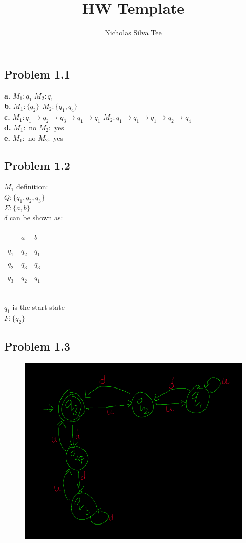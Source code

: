 \documentclass[letter]{article}
\title{HW Template}
\author{Nicholas Silva Tee}
\theoremstyle{case}
\begin{document}
\subsection*{Problem 1.1}
\textbf{a.} $M_1: q_1$ $M_2: q_1$ \\
\textbf{b.} $M_1: \{q_2\}$ $M_2: \{q_1,q_4\}$\\
\textbf{c.} $M_1: q_1 \rightarrow q_2 \rightarrow q_3 \rightarrow q_1 \rightarrow q_1$ 
$M_2: q_1 \rightarrow q_1 \rightarrow q_1 \rightarrow q_2 \rightarrow q_4$\\
\textbf{d.} $M_1:$ no $M_2:$ yes\\
\textbf{e.} $M_1:$ no $M_2:$ yes\\

\subsection*{Problem 1.2}
$M_1$ definition: \\
$Q: \{q_1,q_2,q_3\}$ \\
$\Sigma: \{a,b\}$ \\
$\delta$ can be shown as: \\
\begin{table}[h!]
\begin{tabular}{l|ll}
 &$a$  &$b$  \\ \hline
$q_1$ &$q_2$  &$q_1$  \\
$q_2$ &$q_3$  &$q_3$  \\
$q_3$ &$q_2$  &$q_1$ 
\end{tabular}
\end{table} \\
$q_1$ is the start state \\
$F: \{q_2\}$

\subsection*{Problem 1.3}
\begin{figure}[h!]
	\includegraphics[scale=0.4]{model1.png}
\end{figure}
\end{document}
